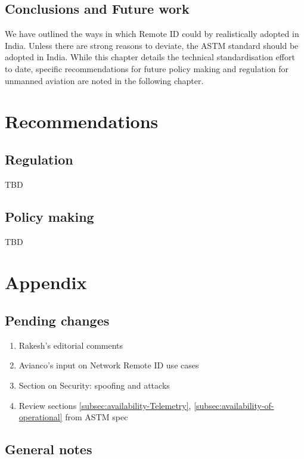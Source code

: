 \documentclass{ua_wgs_base}
\begin{document}
\section{Conclusions and Future work}

We have outlined the ways in which Remote ID could by realistically
adopted in India. Unless there are strong reasons to deviate, the
ASTM standard should be adopted in India. While this chapter details
the technical standardisation effort to date, specific recommendations
for future policy making and regulation for unmanned aviation are
noted in the following chapter.

\cleardoublepage{}

\chapter{Recommendations}

\section{Regulation}

TBD

\section{Policy making}

TBD

\cleardoublepage{}

\chapter{Appendix}

\section{Pending changes}
\begin{enumerate}
\item Rakesh's editorial comments
\item Avianco's input on Network Remote ID use cases
\item Section on Security: spoofing and attacks
\item Review sections \ref{subsec:availability-Telemetry}, \ref{subsec:availability-of-operational}
from ASTM spec
\end{enumerate}

\section{General notes}
\end{document}
